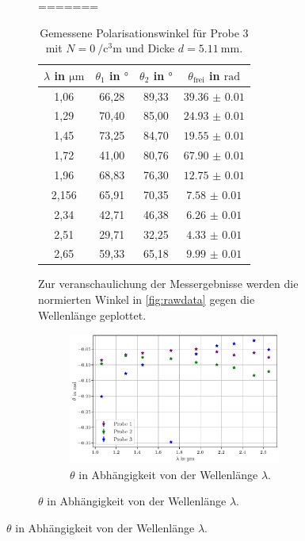 \begin{figure}[H]
\begin{figure}
=======
\begin{table}[H]
    \centering
    \caption{Gemessene Polarisationswinkel für Probe 3 mit $N = \qty{0}{\per\cubic\centi\meter}$ und Dicke $d = \qty{5.11}{\milli\meter}$.}
    \label{tab:probe3}
    \begin{tabular}{c c c c}
        \toprule
        {$\lambda$ in $\si{\micro\meter}$} & {$\theta_1$ in $\si{\degree}$} & {$\theta_2$ in $\si{\degree}$} & {$\theta_\text{frei}$ in $\si{\radian}$} \\
        \midrule
        1,06  & 66,28 & 89,33 & $\num{39.36(1)}$ \\
        1,29  & 70,40 & 85,00 & $\num{24.93(1)}$ \\
        1,45  & 73,25 & 84,70 & $\num{19.55(1)}$ \\
        1,72  & 41,00 & 80,76 & $\num{67.90(1)}$ \\
        1,96  & 68,83 & 76,30 & $\num{12.75(1)}$ \\
        2,156 & 65,91 & 70,35 & $\num{7.58(1)}$  \\
        2,34  & 42,71 & 46,38 & $\num{6.26(1)}$ \\
        2,51  & 29,71 & 32,25 & $\num{4.33(1)}$ \\
        2,65  & 59,33 & 65,18 & $\num{9.99(1)}$ \\   
        \bottomrule
    \end{tabular}
\end{table}
Zur veranschaulichung der Messergebnisse werden die normierten Winkel in \autoref{fig:rawdata} gegen die Wellenlänge geplottet.
\begin{figure}
    \centering
    \includegraphics[width=\textwidth]{plots/raw_data.pdf}
    \caption{$\theta$ in Abhängigkeit von der Wellenlänge $\lambda$.}
    \label{fig:rawdata}
\end{figure}


\end{figure}
\end{figure}
